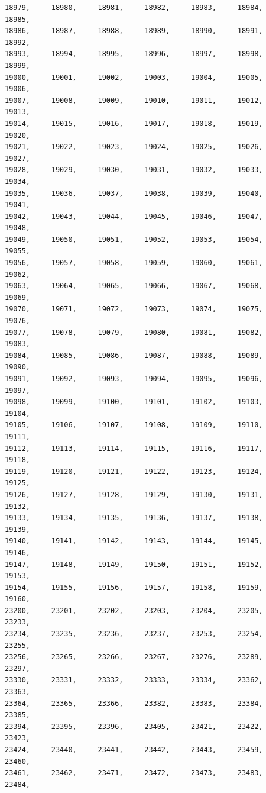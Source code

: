 \documentclass[a4paper,11pt]{report}
\begin{document}
\begin{verbatim}
18979,     18980,     18981,     18982,     18983,     18984,     18985,     
18986,     18987,     18988,     18989,     18990,     18991,     18992,     
18993,     18994,     18995,     18996,     18997,     18998,     18999,     
19000,     19001,     19002,     19003,     19004,     19005,     19006,     
19007,     19008,     19009,     19010,     19011,     19012,     19013,     
19014,     19015,     19016,     19017,     19018,     19019,     19020,     
19021,     19022,     19023,     19024,     19025,     19026,     19027,     
19028,     19029,     19030,     19031,     19032,     19033,     19034,     
19035,     19036,     19037,     19038,     19039,     19040,     19041,     
19042,     19043,     19044,     19045,     19046,     19047,     19048,     
19049,     19050,     19051,     19052,     19053,     19054,     19055,     
19056,     19057,     19058,     19059,     19060,     19061,     19062,     
19063,     19064,     19065,     19066,     19067,     19068,     19069,     
19070,     19071,     19072,     19073,     19074,     19075,     19076,     
19077,     19078,     19079,     19080,     19081,     19082,     19083,     
19084,     19085,     19086,     19087,     19088,     19089,     19090,     
19091,     19092,     19093,     19094,     19095,     19096,     19097,     
19098,     19099,     19100,     19101,     19102,     19103,     19104,     
19105,     19106,     19107,     19108,     19109,     19110,     19111,     
19112,     19113,     19114,     19115,     19116,     19117,     19118,     
19119,     19120,     19121,     19122,     19123,     19124,     19125,     
19126,     19127,     19128,     19129,     19130,     19131,     19132,     
19133,     19134,     19135,     19136,     19137,     19138,     19139,     
19140,     19141,     19142,     19143,     19144,     19145,     19146,     
19147,     19148,     19149,     19150,     19151,     19152,     19153,     
19154,     19155,     19156,     19157,     19158,     19159,     19160,     
23200,     23201,     23202,     23203,     23204,     23205,     23233,     
23234,     23235,     23236,     23237,     23253,     23254,     23255,     
23256,     23265,     23266,     23267,     23276,     23289,     23297,     
23330,     23331,     23332,     23333,     23334,     23362,     23363,     
23364,     23365,     23366,     23382,     23383,     23384,     23385,     
23394,     23395,     23396,     23405,     23421,     23422,     23423,     
23424,     23440,     23441,     23442,     23443,     23459,     23460,     
23461,     23462,     23471,     23472,     23473,     23483,     23484,     

\end{verbatim}
\end{document}
